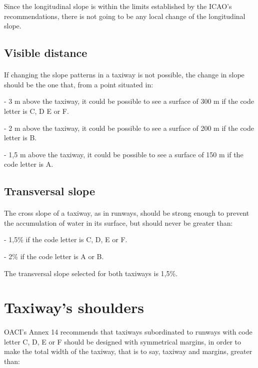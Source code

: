 		Since the longitudinal slope is within the limits established by the ICAO's recommendations, there is not going to be any local change of the longitudinal slope.
		
		\subsection{Visible distance}
		\paragraph{}If changing the slope patterns in a taxiway is not possible, the change in slope should be the one that, from a point situated in:
	
		-	3 m above the taxiway, it could be possible to see a surface of 300 m if the code letter is C, D E or F.
	
		-	2 m above the taxiway, it could be possible to see a surface of 200 m if the code letter is B.
	
		-	1,5 m above the taxiway, it could be possible to see a surface of 150 m if the code letter is A.
	
		\subsection{Transversal slope} 
		\paragraph{}The cross slope of a taxiway, as in runways, should be strong enough to prevent the accumulation of water in its surface, but should never be greater than:
		
		-	1,5\% if the code letter is C, D, E or F.
		
		-	2\% if the code letter is A or B.
		
		The transversal slope selected for both taxiways is 1,5\%.
	
	\section{Taxiway's shoulders}
	\paragraph{}OACI’s Annex 14 recommends that taxiways subordinated to runways with code letter C, D, E or F should be designed with symmetrical margins, in order to make the total width of the taxiway, that is to say, taxiway and margins, greater than:
	
